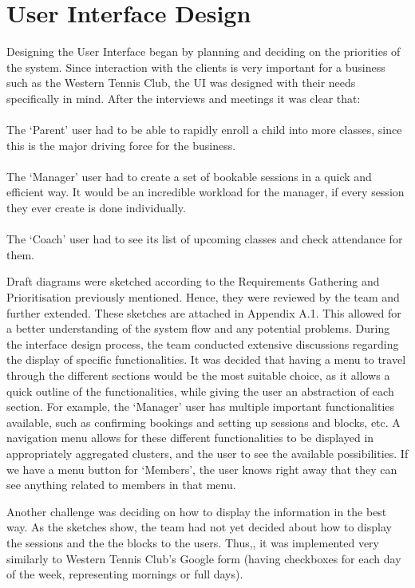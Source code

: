 \documentclass{l3proj}
\begin{document}
\section{User Interface Design}
\par
Designing the User Interface began by planning and deciding on the priorities of the system. Since interaction with the clients is very important for a business such as the Western Tennis Club, the UI was designed with their needs specifically in mind. After the interviews and meetings it was clear that:\\
\\The `Parent' user had to be able to rapidly enroll a child into more classes, since this is the major driving force for the business.\\
\\The `Manager' user had to create a set of bookable sessions in a quick and efficient way. It would be an incredible workload for the manager, if every session they ever create is done individually.\\
\\The `Coach' user had to see its list of upcoming classes and check attendance for them.\\
\par Draft diagrams were sketched according to the Requirements Gathering and Prioritisation previously mentioned. Hence, they were reviewed by the team and further extended. These sketches are attached in Appendix A.1. This allowed for a better understanding of the system flow and any potential problems. During the interface design process, the team conducted extensive discussions regarding the display of specific functionalities.  It was decided that having a menu to travel through the different sections would be the most suitable choice, as it allows a quick outline of the functionalities, while giving the user an abstraction of each section. For example, the `Manager' user has multiple important functionalities available, such as confirming bookings and setting up sessions and blocks, etc. A navigation menu allows for these different functionalities to be displayed in appropriately aggregated clusters, and the user to see the available possibilities. If we have a menu button for `Members', the user knows right away that they can see anything related to members in that menu.\\ 
\par Another challenge was deciding on how to display the information in the best way. As the sketches show, the team had not yet decided about how to display the sessions and the the blocks to the users. Thus,, it was implemented very similarly to Western Tennis Club’s Google form (having checkboxes for each day of the week, representing mornings or full days). \\
\end{document}
